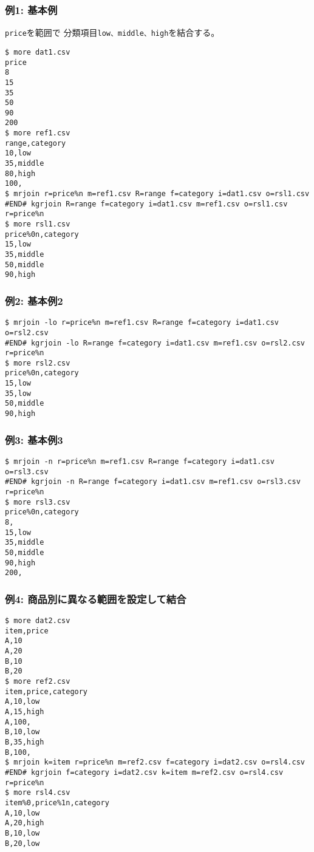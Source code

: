 \subsubsection*{例1: 基本例}

\verb|price|を範囲で
分類項目\verb|low、middle、high|を結合する。


\begin{Verbatim}[baselinestretch=0.7,frame=single]
$ more dat1.csv
price
8
15
35
50
90
200
$ more ref1.csv
range,category
10,low
35,middle
80,high
100,
$ mrjoin r=price%n m=ref1.csv R=range f=category i=dat1.csv o=rsl1.csv
#END# kgrjoin R=range f=category i=dat1.csv m=ref1.csv o=rsl1.csv r=price%n
$ more rsl1.csv
price%0n,category
15,low
35,middle
50,middle
90,high
\end{Verbatim}
\subsubsection*{例2: 基本例2}



\begin{Verbatim}[baselinestretch=0.7,frame=single]
$ mrjoin -lo r=price%n m=ref1.csv R=range f=category i=dat1.csv o=rsl2.csv
#END# kgrjoin -lo R=range f=category i=dat1.csv m=ref1.csv o=rsl2.csv r=price%n
$ more rsl2.csv
price%0n,category
15,low
35,low
50,middle
90,high
\end{Verbatim}
\subsubsection*{例3: 基本例3}



\begin{Verbatim}[baselinestretch=0.7,frame=single]
$ mrjoin -n r=price%n m=ref1.csv R=range f=category i=dat1.csv o=rsl3.csv
#END# kgrjoin -n R=range f=category i=dat1.csv m=ref1.csv o=rsl3.csv r=price%n
$ more rsl3.csv
price%0n,category
8,
15,low
35,middle
50,middle
90,high
200,
\end{Verbatim}
\subsubsection*{例4: 商品別に異なる範囲を設定して結合}



\begin{Verbatim}[baselinestretch=0.7,frame=single]
$ more dat2.csv
item,price
A,10
A,20
B,10
B,20
$ more ref2.csv
item,price,category
A,10,low
A,15,high
A,100,
B,10,low
B,35,high
B,100,
$ mrjoin k=item r=price%n m=ref2.csv f=category i=dat2.csv o=rsl4.csv
#END# kgrjoin f=category i=dat2.csv k=item m=ref2.csv o=rsl4.csv r=price%n
$ more rsl4.csv
item%0,price%1n,category
A,10,low
A,20,high
B,10,low
B,20,low
\end{Verbatim}
